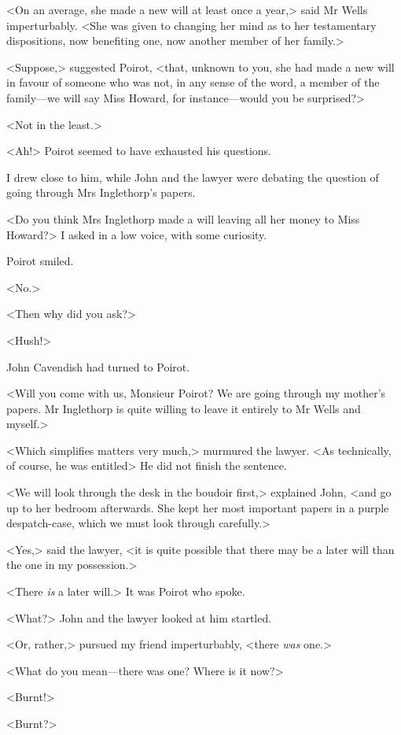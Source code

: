  <On an average, she made a new will at least once a year,> said Mr Wells imperturbably. <She was given to changing her mind as to her testamentary dispositions, now benefiting one, now another member of her family.> 

 <Suppose,> suggested Poirot, <that, unknown to you, she had made a new will in favour of someone who was not, in any sense of the word, a member of the family—we will say Miss Howard, for instance—would you be surprised?> 

 <Not in the least.> 

 <Ah!> Poirot seemed to have exhausted his questions. 

 I drew close to him, while John and the lawyer were debating the question of going through Mrs Inglethorp's papers. 

 <Do you think Mrs Inglethorp made a will leaving all her money to Miss Howard?> I asked in a low voice, with some curiosity. 

 Poirot smiled. 

 <No.> 

 <Then why did you ask?> 

 <Hush!> 

 John Cavendish had turned to Poirot. 

 <Will you come with us, Monsieur Poirot? We are going through my mother's papers. Mr Inglethorp is quite willing to leave it entirely to Mr Wells and myself.> 

 <Which simplifies matters very much,> murmured the lawyer. <As technically, of course, he was entitled\longdash> He did not finish the sentence. 

 <We will look through the desk in the boudoir first,> explained John, <and go up to her bedroom afterwards. She kept her most important papers in a purple despatch-case, which we must look through carefully.> 

 <Yes,> said the lawyer, <it is quite possible that there may be a later will than the one in my possession.> 

 <There \emph{is} a later will.> It was Poirot who spoke. 

 <What?> John and the lawyer looked at him startled. 

 <Or, rather,> pursued my friend imperturbably, <there \emph{was} one.> 

 <What do you mean—there was one? Where is it now?> 

 <Burnt!> 

 <Burnt?> 

